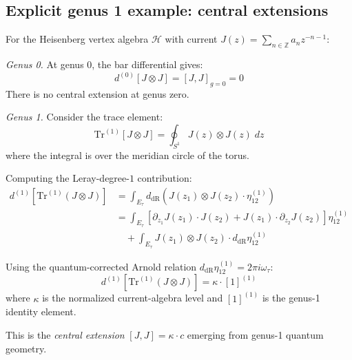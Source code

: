 \subsection{Explicit genus 1 example: central extensions}

\begin{example}
\label{ex:heisenberg-genus-1}
For the Heisenberg vertex algebra $\mathcal{H}$ with current $J(z) = \sum_{n \in \mathbb{Z}} a_n z^{-n-1}$:

\emph{Genus 0.} At genus $0$, the bar differential gives:
\begin{equation}
d^{(0)}[J \otimes J] = [J, J]_{g=0} = 0
\end{equation}
There is no central extension at genus zero.

\emph{Genus 1.} Consider the trace element:
\begin{equation}
\text{Tr}^{(1)}[J \otimes J] = \oint_{S^1} J(z) \otimes J(z) \; dz
\end{equation}
where the integral is over the meridian circle of the torus.

Computing the Leray-degree-$1$ contribution:
\begin{align}
d^{(1)}[\text{Tr}^{(1)}(J \otimes J)] &= \int_{E_\tau} d_{\mathrm{dR}}\!\left(J(z_1) \otimes J(z_2) \cdot \eta_{12}^{(1)}\right)\\
&= \int_{E_\tau} \left[\partial_{z_1} J(z_1) \cdot J(z_2) + J(z_1) \cdot \partial_{z_2} J(z_2)\right] \eta_{12}^{(1)}\\
&\quad + \int_{E_\tau} J(z_1) \otimes J(z_2) \cdot d_{\mathrm{dR}}\eta_{12}^{(1)}
\end{align}

Using the quantum-corrected Arnold relation
$d_{\mathrm{dR}}\eta_{12}^{(1)} = 2\pi i \omega_\tau$:
\begin{equation}
d^{(1)}[\text{Tr}^{(1)}(J \otimes J)] = \kappa \cdot [1]^{(1)}
\end{equation}
where $\kappa$ is the normalized current-algebra level and
$[1]^{(1)}$ is the genus-1 identity element.

This is the \emph{central extension} $[J, J] = \kappa \cdot c$ emerging from genus-1 quantum geometry.
\end{example}


